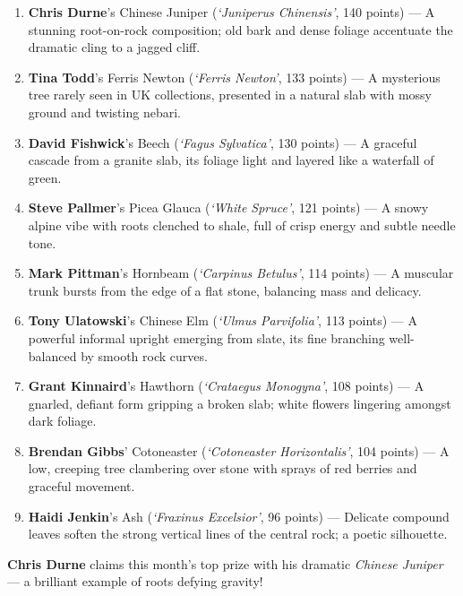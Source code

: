 \begin{enumerate}
    \item \textbf{Chris Durne}'s Chinese Juniper (\textit{`Juniperus Chinensis'}, 140 points) --- A stunning root\--on\--rock composition; old bark and dense foliage accentuate the dramatic cling to a jagged cliff.

    \item \textbf{Tina Todd}'s Ferris Newton (\textit{`Ferris Newton'}, 133 points) --- A mysterious tree rarely seen in UK collections, presented in a natural slab with mossy ground and twisting nebari.

    \item \textbf{David Fishwick}'s Beech (\textit{`Fagus Sylvatica'}, 130 points) --- A graceful cascade from a granite slab, its foliage light and layered like a waterfall of green.

    \item \textbf{Steve Pallmer}'s Picea Glauca (\textit{`White Spruce'}, 121 points) --- A snowy alpine vibe with roots clenched to shale, full of crisp energy and subtle needle tone.

    \item \textbf{Mark Pittman}'s Hornbeam (\textit{`Carpinus Betulus'}, 114 points) --- A muscular trunk bursts from the edge of a flat stone, balancing mass and delicacy.

    \item \textbf{Tony Ulatowski}'s Chinese Elm (\textit{`Ulmus Parvifolia'}, 113 points) --- A powerful informal upright emerging from slate, its fine branching well\--balanced by smooth rock curves.

    \item \textbf{Grant Kinnaird}'s Hawthorn (\textit{`Crataegus Monogyna'}, 108 points) --- A gnarled, defiant form gripping a broken slab; white flowers lingering amongst dark foliage.

    \item \textbf{Brendan Gibbs}' Cotoneaster (\textit{`Cotoneaster Horizontalis'}, 104 points) --- A low, creeping tree clambering over stone with sprays of red berries and graceful movement.

    \item \textbf{Haidi Jenkin}'s Ash (\textit{`Fraxinus Excelsior'}, 96 points) --- Delicate compound leaves soften the strong vertical lines of the central rock; a poetic silhouette.
\end{enumerate}

\noindent 
\textbf{Chris Durne} claims this month's top prize with his dramatic \textit{Chinese Juniper} --- a brilliant example of roots defying gravity!

